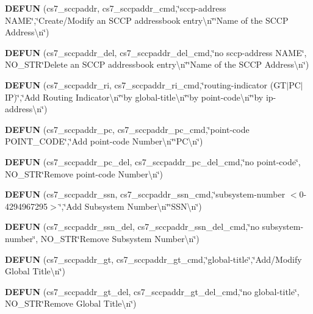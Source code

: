 \begin{DoxyCompactItemize}
\item 
{\bf D\+E\+F\+UN} (cs7\+\_\+sccpaddr, cs7\+\_\+sccpaddr\+\_\+cmd,\char`\"{}sccp-\/address N\+A\+ME\char`\"{},\char`\"{}Create/Modify an S\+C\+CP addressbook entry\textbackslash{}n\char`\"{}\char`\"{}Name of the S\+C\+CP Address\textbackslash{}n\char`\"{})
\item 
{\bf D\+E\+F\+UN} (cs7\+\_\+sccpaddr\+\_\+del, cs7\+\_\+sccpaddr\+\_\+del\+\_\+cmd,\char`\"{}no sccp-\/address N\+A\+ME\char`\"{}, N\+O\+\_\+\+S\+TR\char`\"{}Delete an S\+C\+CP addressbook entry\textbackslash{}n\char`\"{}\char`\"{}Name of the S\+C\+CP Address\textbackslash{}n\char`\"{})
\item 
{\bf D\+E\+F\+UN} (cs7\+\_\+sccpaddr\+\_\+ri, cs7\+\_\+sccpaddr\+\_\+ri\+\_\+cmd,\char`\"{}routing-\/indicator (GT$\vert$PC$\vert$IP)\char`\"{},\char`\"{}Add Routing Indicator\textbackslash{}n\char`\"{}\char`\"{}by global-\/title\textbackslash{}n\char`\"{}\char`\"{}by point-\/code\textbackslash{}n\char`\"{}\char`\"{}by ip-\/address\textbackslash{}n\char`\"{})
\item 
{\bf D\+E\+F\+UN} (cs7\+\_\+sccpaddr\+\_\+pc, cs7\+\_\+sccpaddr\+\_\+pc\+\_\+cmd,\char`\"{}point-\/code P\+O\+I\+N\+T\+\_\+\+C\+O\+DE\char`\"{},\char`\"{}Add point-\/code Number\textbackslash{}n\char`\"{}\char`\"{}P\+C\textbackslash{}n\char`\"{})
\item 
{\bf D\+E\+F\+UN} (cs7\+\_\+sccpaddr\+\_\+pc\+\_\+del, cs7\+\_\+sccpaddr\+\_\+pc\+\_\+del\+\_\+cmd,\char`\"{}no point-\/code\char`\"{}, N\+O\+\_\+\+S\+TR\char`\"{}Remove point-\/code Number\textbackslash{}n\char`\"{})
\item 
{\bf D\+E\+F\+UN} (cs7\+\_\+sccpaddr\+\_\+ssn, cs7\+\_\+sccpaddr\+\_\+ssn\+\_\+cmd,\char`\"{}subsystem-\/number $<$0-\/4294967295$>$\char`\"{},\char`\"{}Add Subsystem Number\textbackslash{}n\char`\"{}\char`\"{}S\+S\+N\textbackslash{}n\char`\"{})
\item 
{\bf D\+E\+F\+UN} (cs7\+\_\+sccpaddr\+\_\+ssn\+\_\+del, cs7\+\_\+sccpaddr\+\_\+ssn\+\_\+del\+\_\+cmd,\char`\"{}no subsystem-\/number\char`\"{}, N\+O\+\_\+\+S\+TR\char`\"{}Remove Subsystem Number\textbackslash{}n\char`\"{})
\item 
{\bf D\+E\+F\+UN} (cs7\+\_\+sccpaddr\+\_\+gt, cs7\+\_\+sccpaddr\+\_\+gt\+\_\+cmd,\char`\"{}global-\/title\char`\"{},\char`\"{}Add/Modify Global Title\textbackslash{}n\char`\"{})
\item 
{\bf D\+E\+F\+UN} (cs7\+\_\+sccpaddr\+\_\+gt\+\_\+del, cs7\+\_\+sccpaddr\+\_\+gt\+\_\+del\+\_\+cmd,\char`\"{}no global-\/title\char`\"{}, N\+O\+\_\+\+S\+TR\char`\"{}Remove Global Title\textbackslash{}n\char`\"{})

\end{DoxyCompactItemize}
